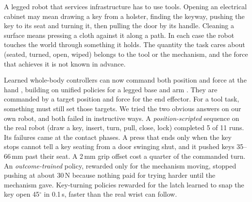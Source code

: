 \documentclass[conference]{IEEEtran}
\begin{document}
A legged robot that services infrastructure has to use tools. Opening an electrical cabinet may mean drawing a key from
a holster, finding the keyway, pushing the key to its seat and turning it, then pulling the door by its handle. Cleaning
a surface means pressing a cloth against it along a path. In each case the robot touches the world through something it
holds. The quantity the task cares about (seated, turned, open, wiped) belongs to the tool or the mechanism, and the
force that achieves it is not known in advance.

Learned whole-body controllers can now command both position and force at the hand
\citep{portela2024learning, zhi2025unified, xu2025facet}, building on unified policies for a legged base and arm
\citep{fu2022deep, liu2024visual, ha2024umi}. They are commanded by a target position and force for the end effector.
For a tool task, something must still set those targets. We tried the two obvious answers on our own robot, and both
failed in instructive ways. A \emph{position-scripted} sequence on the real robot (draw a key, insert, turn, pull, close,
lock) completed 5 of 11 runs. Its failures came at the contact phases. A press that ends only when the key stops cannot
tell a key seating from a door swinging shut, and it pushed keys 35--66\,mm past their seat. A 2\,mm grip offset cost a
quarter of the commanded turn. An \emph{outcome-trained} policy, rewarded only for the mechanism moving, stopped pushing
at about 30\,N because nothing paid for trying harder until the mechanism gave. Key-turning policies rewarded for the
latch learned to snap the key open 45$^\circ$ in 0.1\,s, faster than the real wrist can follow.
\end{document}
